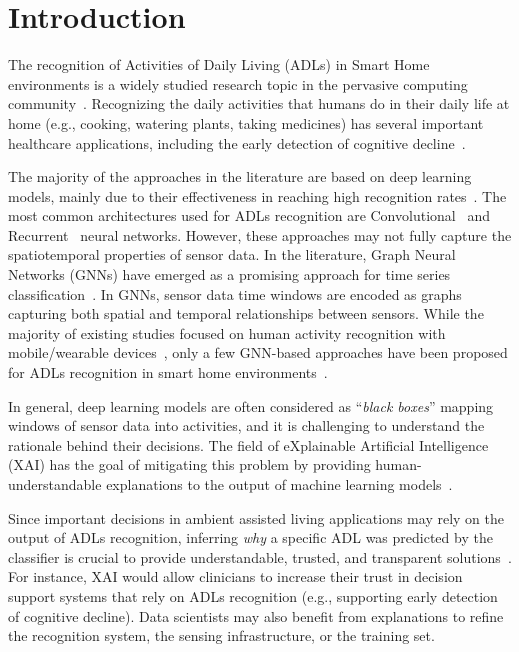 \section{Introduction}

The recognition of Activities of Daily Living (ADLs) in Smart Home environments is a widely studied research topic in the pervasive computing community~\cite{bouchabou2021survey}. Recognizing the daily activities that humans do in their daily life at  home (e.g., cooking, watering plants, taking medicines) has several important healthcare applications, including the early detection of cognitive decline~\cite{riboni2016smartfaber}.

The majority of the approaches in the literature are based on deep learning models, mainly due to their effectiveness in reaching high recognition rates~\cite{gu2021survey}. The most common architectures used for ADLs recognition are Convolutional~\cite{arrotta2022dexar} and Recurrent~\cite{liciotti2020sequential} neural networks. However, these approaches may not fully capture the spatiotemporal properties of sensor data. In the literature, Graph Neural Networks (GNNs) have emerged as a promising approach for time series classification~\cite{duan2022multivariate}. In GNNs, sensor data time windows are encoded as graphs capturing both spatial and temporal relationships between sensors. While the majority of existing studies focused on human activity recognition with mobile/wearable devices~\cite{mondal2020new}, only a few GNN-based approaches have been proposed for ADLs recognition in smart home environments~\cite{ye2023graph,s24123944}. 

In general, deep learning models are often considered as ``\textit{black boxes}'' mapping windows of sensor data into activities, and it is challenging to understand the rationale behind their decisions.
The field of eXplainable Artificial Intelligence (XAI) has the goal of mitigating this problem by providing human-understandable explanations to the output of machine learning models~\cite{arrieta2020explainable}. 

Since important decisions in ambient assisted living applications may rely on the output of ADLs recognition, inferring \emph{why} a specific ADL was predicted by the classifier is crucial to provide understandable, trusted, and transparent solutions~\cite{wolf2019explainability}. For instance, XAI would allow clinicians to increase their trust in decision support systems that rely on ADLs recognition (e.g., supporting early detection of cognitive decline).
Data scientists may also benefit from explanations to refine the recognition system, the sensing infrastructure, or the training set. 

